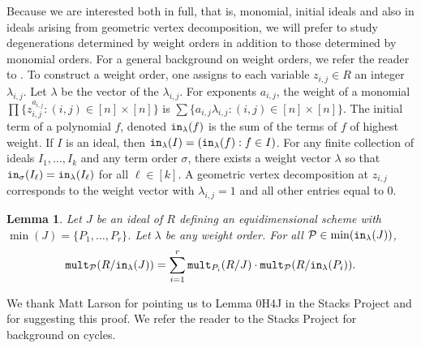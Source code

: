 \documentclass[12pt,reqno]{amsart}
\newtheorem{lemma}[theorem]{Lemma}
\newtheorem{Main Conjecture}[theorem]{Main Conjecture}
\theoremstyle{remark}
\theoremstyle{plain}
\newcommand{\init}{{\tt in}}
\newcommand{\mult}{{\tt mult}}
\begin{document}
Because we are interested both in full, that is, monomial, initial ideals and also in ideals arising from geometric vertex decomposition, we will prefer to study degenerations determined by weight orders in addition to those determined by monomial orders.  For a general background on weight orders, we refer the reader to \cite[Chapter 15]{Eis95}. To construct a weight order, one assigns to each variable $z_{i,j} \in R$ an integer $\lambda_{i,j}$.   Let $\lambda$ be the vector of the $\lambda_{i,j}$. For exponents $a_{i,j}$, the weight of a monomial $\prod \{z_{i,j}^{a_{i,j}}: (i,j) \in [n] \times [n]\}$ is $\sum \{a_{i,j}\lambda_{i,j}: (i,j) \in [n] \times [n]\}$.  The initial term of a polynomial $f$, denoted $\init_{\lambda}(f)$ is the sum of the terms of $f$ of highest weight.  If $I$ is an ideal, then $\init_\lambda(I) = (\init_\lambda(f): f \in I)$. For any finite collection of ideals $I_1, \ldots, I_k$ and any term order $\sigma$, there exists a weight vector $\lambda$ so that $\init_{\sigma}(I_\ell) = \init_\lambda(I_\ell)$ for all $\ell \in [k]$.  A geometric vertex decomposition at $z_{i,j}$ corresponds to the weight vector with $\lambda_{i,j} = 1$ and all other entries equal to $0$.

\begin{lemma}\label{lem:primaryMult} Let $J$ be an ideal of $R$ defining an equidimensional scheme with $\min(J) = \{P_1, \ldots, P_r\}$. Let $\lambda$ be any weight order.  For all $\mathcal{P} \in \min(\init_\lambda(J))$, 
\[
\mult_\mathcal{P}(R/\init_\lambda(J)) = \displaystyle \sum_{i=1}^r  \mult_{P_i}(R/J) \cdot \mult_{\mathcal{P}}(R/\init_\lambda(P_i) ).
\]
\end{lemma}

We thank Matt Larson for pointing us to Lemma 0H4J in the Stacks Project \cite{stacks-project} and for suggesting this proof.  We refer the reader to the Stacks Project for background on cycles.
\end{document}

